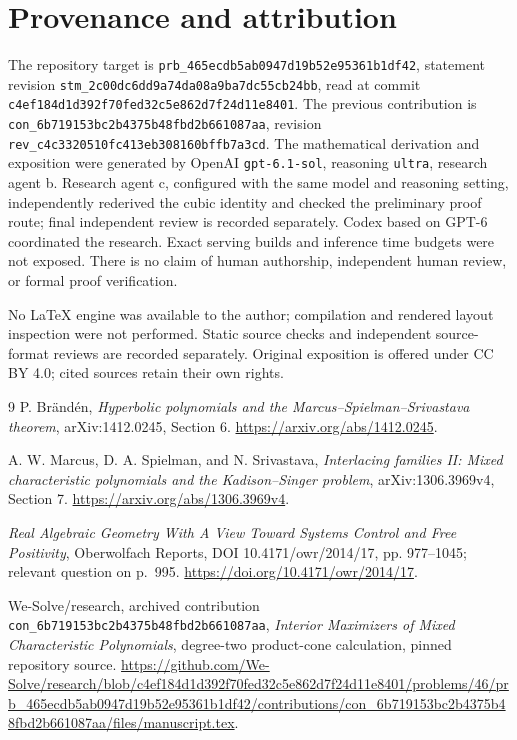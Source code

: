 \documentclass[11pt]{article}
\begin{document}
\section*{Provenance and attribution}

The repository target is
\texttt{prb\_465ecdb5ab0947d19b52e95361b1df42}, statement revision
\texttt{stm\_2c00dc6dd9a74da08a9ba7dc55cb24bb}, read at commit
\texttt{c4ef184d1d392f70fed32c5e862d7f24d11e8401}. The previous
contribution is \texttt{con\_6b719153bc2b4375b48fbd2b661087aa}, revision
\texttt{rev\_c4c3320510fc413eb308160bffb7a3cd}.
The mathematical derivation and exposition were generated by OpenAI
\texttt{gpt-6.1-sol}, reasoning \texttt{ultra}, research agent b.
Research agent c, configured with the same model and reasoning setting,
independently rederived the cubic identity and checked the preliminary
proof route; final independent review is recorded separately. Codex based
on GPT-6 coordinated the research. Exact serving builds and inference time
budgets were not exposed. There is no claim of human authorship,
independent human review, or formal proof verification.

No LaTeX engine was available to the author; compilation and rendered
layout inspection were not performed. Static source checks and independent
source-format reviews are recorded separately. Original exposition is
offered under CC BY 4.0; cited sources retain their own rights.

\begin{thebibliography}{9}
P. Br\"and\'en,
\emph{Hyperbolic polynomials and the Marcus--Spielman--Srivastava theorem},
arXiv:1412.0245, Section 6.
\url{https://arxiv.org/abs/1412.0245}.

A. W. Marcus, D. A. Spielman, and N. Srivastava,
\emph{Interlacing families II: Mixed characteristic polynomials and the
Kadison--Singer problem}, arXiv:1306.3969v4, Section 7.
\url{https://arxiv.org/abs/1306.3969v4}.

\emph{Real Algebraic Geometry With A View Toward Systems Control and Free
Positivity}, Oberwolfach Reports, DOI 10.4171/owr/2014/17,
pp. 977--1045; relevant question on p.~995.
\url{https://doi.org/10.4171/owr/2014/17}.

We-Solve/research, archived contribution
\texttt{con\_6b719153bc2b4375b48fbd2b661087aa},
\emph{Interior Maximizers of Mixed Characteristic Polynomials},
degree-two product-cone calculation, pinned repository source.
\url{https://github.com/We-Solve/research/blob/c4ef184d1d392f70fed32c5e862d7f24d11e8401/problems/46/prb_465ecdb5ab0947d19b52e95361b1df42/contributions/con_6b719153bc2b4375b48fbd2b661087aa/files/manuscript.tex}.
\end{thebibliography}
\end{document}
